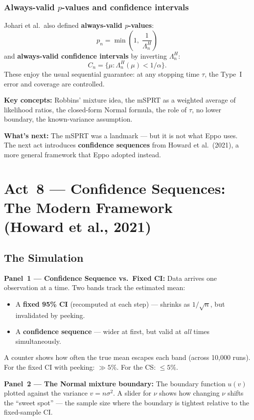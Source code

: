 \documentclass[12pt, a4paper]{article}
\newcommand{\LR}{\Lambda}              %
\begin{document}
\subsubsection*{Always-valid $p$-values and confidence intervals}

Johari et al.\ also defined \textbf{always-valid $p$-values}:
\[
  p_n = \min\!\left(1,\; \frac{1}{\LR_n^{H}}\right)
\]
and \textbf{always-valid confidence intervals} by inverting $\LR_n^H$:
\[
  C_n = \bigl\{\mu : \LR_n^{H}(\mu) < 1/\alpha \bigr\}.
\]
These enjoy the usual sequential guarantee: at any stopping time $\tau$,
the Type~I error and coverage are controlled.

\begin{keytakeaway}
\textbf{Key concepts:} Robbins' mixture idea, the mSPRT as a weighted average
of likelihood ratios, the closed-form Normal formula, the role of $\tau$,
no lower boundary, the known-variance assumption.

\textbf{What's next:}  The mSPRT was a landmark --- but it is not what Eppo
uses.  The next act introduces \textbf{confidence sequences} from
Howard et al.\ (2021), a more general framework that Eppo adopted instead.
\end{keytakeaway}


\newpage
\section{Act~8 --- Confidence Sequences: The Modern Framework\\ (Howard et al., 2021)}

\subsection{The Simulation}

\begin{simulation}
\textbf{Panel~1 --- Confidence Sequence vs.\ Fixed CI:}
Data arrives one observation at a time.  Two bands track the estimated mean:
\begin{itemize}[nosep]
  \item A \textbf{fixed 95\% CI} (recomputed at each step) --- shrinks as
        $1/\sqrt{n}$, but invalidated by peeking.
  \item A \textbf{confidence sequence} --- wider at first, but valid at
        \emph{all} times simultaneously.
\end{itemize}
A counter shows how often the true mean escapes each band (across 10,000
runs).  For the fixed CI with peeking: $\gg 5\%$.  For the CS: $\leq 5\%$.

\textbf{Panel~2 --- The Normal mixture boundary:}
The boundary function $u(v)$ plotted against the variance $v = n\sigma^2$.
A slider for $\nu$ shows how changing $\nu$ shifts the ``sweet spot'' ---
the sample size where the boundary is tightest relative to the fixed-sample
CI.
\end{simulation}
\end{document}
